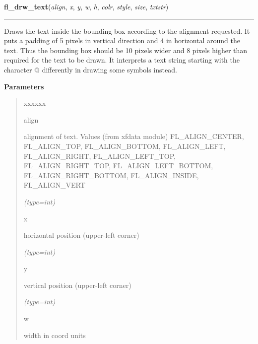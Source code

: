    \vspace{0.5ex}

\hspace{.8\funcindent}\begin{boxedminipage}{\funcwidth}

    \raggedright \textbf{fl\_drw\_text}(\textit{align}, \textit{x}, \textit{y}, \textit{w}, \textit{h}, \textit{colr}, \textit{style}, \textit{size}, \textit{txtstr})

    \vspace{-1.5ex}

    \rule{\textwidth}{0.5\fboxrule}
\setlength{\parskip}{2ex}
    Draws the text inside the bounding box according to the alignment 
    requested. It puts a padding of 5 pixels in vertical direction and 4 in
    horizontal around the text. Thus the bounding box should be 10 pixels 
    wider and 8 pixels higher than required for the text to be drawn. It 
    interprets a text string starting with the character @ differently in 
    drawing some symbols instead.

\setlength{\parskip}{1ex}
      \textbf{Parameters}
      \vspace{-1ex}

      \begin{quote}
        \begin{Ventry}{xxxxxx}

          \item[align]

          alignment of text. Values (from xfdata module) FL\_ALIGN\_CENTER,
          FL\_ALIGN\_TOP, FL\_ALIGN\_BOTTOM, FL\_ALIGN\_LEFT, 
          FL\_ALIGN\_RIGHT, FL\_ALIGN\_LEFT\_TOP, FL\_ALIGN\_RIGHT\_TOP, 
          FL\_ALIGN\_LEFT\_BOTTOM, FL\_ALIGN\_RIGHT\_BOTTOM, 
          FL\_ALIGN\_INSIDE, FL\_ALIGN\_VERT

            {\it (type=int)}

          \item[x]

          horizontal position (upper-left corner)

            {\it (type=int)}

          \item[y]

          vertical position (upper-left corner)

            {\it (type=int)}

          \item[w]

          width in coord units


\end{Ventry}
\end{quote}
\end{boxedminipage}
